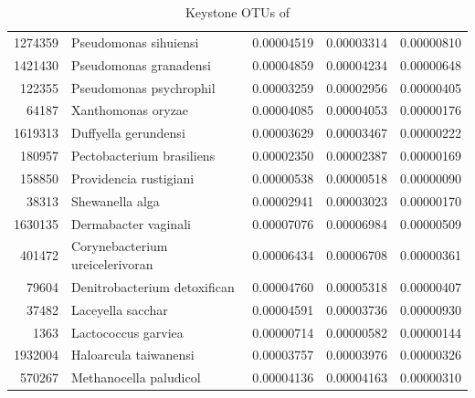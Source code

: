 \begin{table}[ht]
\begin{tabular}{rlrrr}
  1274359 & Pseudomonas sihuiensi & 0.00004519 & 0.00003314 & 0.00000810 \\ 
  1421430 & Pseudomonas granadensi & 0.00004859 & 0.00004234 & 0.00000648 \\ 
  122355 & Pseudomonas psychrophil & 0.00003259 & 0.00002956 & 0.00000405 \\ 
  64187 & Xanthomonas oryzae & 0.00004085 & 0.00004053 & 0.00000176 \\ 
  1619313 & Duffyella gerundensi & 0.00003629 & 0.00003467 & 0.00000222 \\ 
  180957 & Pectobacterium brasiliens & 0.00002350 & 0.00002387 & 0.00000169 \\ 
  158850 & Providencia rustigiani & 0.00000538 & 0.00000518 & 0.00000090 \\ 
  38313 & Shewanella alga & 0.00002941 & 0.00003023 & 0.00000170 \\ 
  1630135 & Dermabacter vaginali & 0.00007076 & 0.00006984 & 0.00000509 \\ 
  401472 & Corynebacterium ureicelerivoran & 0.00006434 & 0.00006708 & 0.00000361 \\ 
  79604 & Denitrobacterium detoxifican & 0.00004760 & 0.00005318 & 0.00000407 \\ 
  37482 & Laceyella sacchar & 0.00004591 & 0.00003736 & 0.00000930 \\ 
  1363 & Lactococcus garviea & 0.00000714 & 0.00000582 & 0.00000144 \\ 
  1932004 & Haloarcula taiwanensi & 0.00003757 & 0.00003976 & 0.00000326 \\ 
  570267 & Methanocella paludicol & 0.00004136 & 0.00004163 & 0.00000310 \\ 
   \hline
\end{tabular}
\caption{Keystone OTUs of } 
\end{table}
